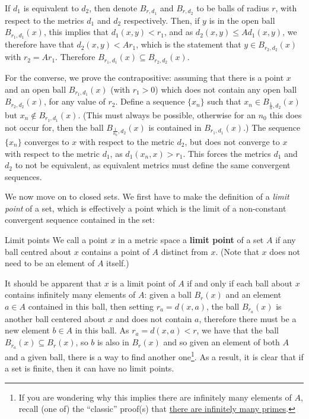 \begin{bproof}{}{}
If $d_{1}$ is equivalent to $d_{2}$, then denote $B_{r,d_{1}}$ and $B_{r,d_{2}}$ to be balls of radius $r$, with respect to the metrics $d_{1}$ and $d_{2}$ respectively. Then, if $y$ is in the open ball $B_{r_{1},d_{1}}(x)$, this implies that $d_{1}(x,y)<r_{1}$, and as $d_{2}(x,y) \leq A d_{1}(x,y)$, we therefore have that $d_{2}(x,y) < A r_{1}$, which is the statement that $y\in B_{r_{2},d_{2}}(x)$ with $r_{2} = A r_{1}$. Therefore $B_{r_{1},d_{1}}(x) \subseteq B_{r_{2},d_{2}}(x)$.

For the converse, we prove the contrapositive: assuming that there is a point $x$ and an open ball $B_{r_{1},d_{1}}(x)$ (with $r_{1}>0$) which does not contain any open ball $B_{r_{2},d_{2}}(x)$, for any value of $r_{2}$. Define a sequence $\{ x_{n}\}$ such that $x_{n} \in B_{\frac{1}{n},d_{2}}(x)$ but $x_{n} \not\in B_{r_{1},d_{1}}(x)$. (This must always be possible, otherwise for an $n_{0}$ this does not occur for, then the ball $B_{\frac{1}{n_{0}},d_{2}}(x)$ is contained in $B_{r_{1},d_{1}}(x)$.) The sequence $\{x_{n}\}$ converges to $x$ with respect to the metric $d_{2}$, but does not converge to $x$ with respect to the metric $d_{1}$, as $d_{1}(x_{n},x)>r_{1}$. This forces the metrics $d_{1}$ and $d_{2}$ to not be equivalent, as equivalent metrics must define the same convergent sequences.
\eop
\end{bproof}

We now move on to closed sets. We first have to make the definition of a \emph{limit point} of a set, which is effectively a point which is the limit of a non-constant convergent sequence contained in the set:
\begin{bdefin}{Limit points}{}
We call a point $x$ in a metric space a \textbf{limit point} of a set $A$ if any ball centred about $x$ contains a point of $A$ distinct from $x$. (Note that $x$ does not need to be an element of $A$ itself.)
\end{bdefin}

It should be apparent that $x$ is a limit point of $A$ if and only if each ball about $x$ contains infinitely many elements of $A$: given a ball $B_{r}(x)$ and an element $a\in A$ contained in this ball, then setting $r_{a} = d(x,a)$, the ball $B_{r_{a}}(x)$ is another ball centered about $x$ and does not contain $a$, therefore there must be a new element $b\in A$ in this ball. As $r_{a} = d(x,a) < r$, we have that the ball $B_{r_{a}}(x) \subseteq B_{r}(x)$, so $b$ is also in $B_{r}(x)$ and so given an element of both $A$ and a given ball, there is a way to find another one\footnote{If you are wondering why this implies there are infinitely many elements of $A$, recall (one of) the “classic” proof(s) that \href{https://primes.utm.edu/notes/proofs/infinite/euclids.html}{there are infinitely many primes}.}. As a result, it is clear that if a set is finite, then it can have no limit points.

